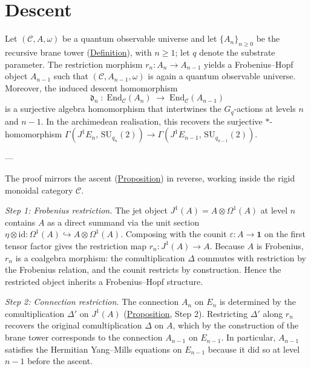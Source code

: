 \section{Descent}
\label{ssec:descent}



\begin{lemma}
  \label{lem:descent}
Let $(\mathcal{C}, A, \omega)$ be a quantum observable universe and let
$\{A_n\}_{n \geq 0}$ be the recursive brane tower
(\hyperref[def:recursive-brane-tower]{Definition}), with $n \geq 1$; let $q$ denote the substrate parameter.  The
restriction morphism $r_n \colon A_n \to A_{n-1}$ yields a Frobenius--Hopf
object $A_{n-1}$ such that $(\mathcal{C}, A_{n-1}, \omega)$ is again a
quantum observable universe.  Moreover, the induced descent homomorphism
\[
\mathfrak{d}_n \;\colon\;
  \mathrm{End}_{\mathcal{C}}(A_n)
  \;\longrightarrow\;
  \mathrm{End}_{\mathcal{C}}(A_{n-1})
\]
is a surjective algebra homomorphism that intertwines the $G_q$-actions at
levels $n$ and $n{-}1$.  In the archimedean realisation, this recovers
the surjective $*$-homomorphism
$\Gamma(J^1 E_n,\, \mathrm{SU}_{q_n}(2)) \to
\Gamma(J^1 E_{n-1},\, \mathrm{SU}_{q_{n-1}}(2))$.

---

The proof mirrors the ascent (\hyperref[prop:jet-prolongation]{Proposition}) in
reverse, working inside the rigid monoidal category $\mathcal{C}$.

\emph{Step 1: Frobenius restriction.}
The jet object $J^1(A) = A \otimes \Omega^1(A)$ at level $n$ contains $A$
as a direct summand via the unit section
$\eta \otimes \mathrm{id}\colon \Omega^1(A) \hookrightarrow A \otimes
\Omega^1(A)$.  Composing with the counit $\varepsilon\colon A \to \mathbf{1}$
on the first tensor factor gives the restriction map
$r_n\colon J^1(A) \to A$.  Because $A$ is Frobenius, $r_n$ is a coalgebra
morphism: the comultiplication $\Delta$ commutes with restriction by the
Frobenius relation, and the counit restricts by construction.  Hence the
restricted object inherits a Frobenius--Hopf structure.

\emph{Step 2: Connection restriction.}
The connection $A_n$ on $E_n$ is determined by the comultiplication
$\Delta'$ on $J^1(A)$ (\hyperref[prop:jet-prolongation]{Proposition}, Step 2).
Restricting $\Delta'$ along $r_n$ recovers the original comultiplication
$\Delta$ on $A$, which by the construction of the brane tower corresponds to
the connection $A_{n-1}$ on $E_{n-1}$.  In particular, $A_{n-1}$ satisfies
the Hermitian Yang--Mills equations on $E_{n-1}$ because it did so at level
$n{-}1$ before the ascent.


\end{lemma}
